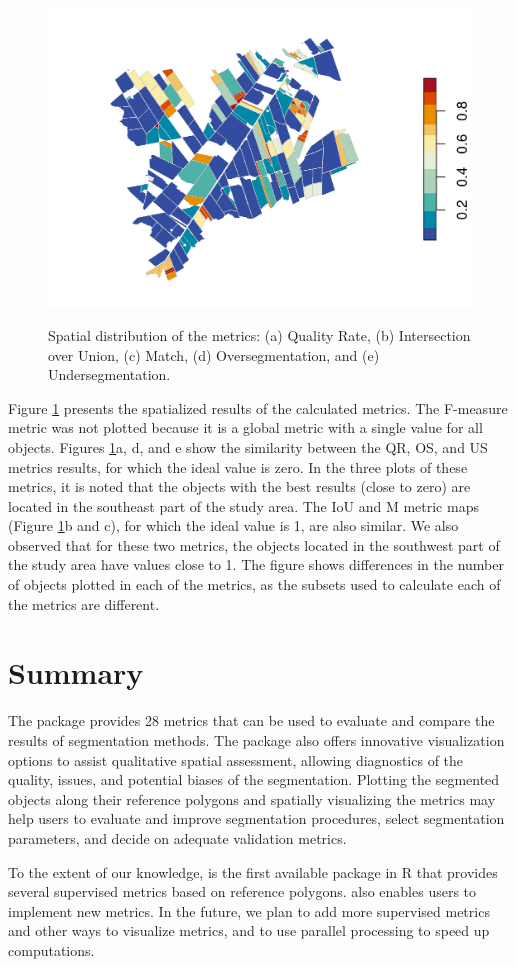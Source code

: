 \begin{figure}[!ht]
    {\includegraphics[trim=60 10 0 10, clip, width=.49\textwidth]{fig6e.png}}
    \caption{Spatial distribution of the metrics: (a) Quality Rate, (b) Intersection over Union, (c) Match, (d) Oversegmentation, and (e) Undersegmentation.}
    \label{fig:plot_metrics}
\end{figure}

Figure \ref{fig:plot_metrics} presents the spatialized results of the calculated metrics. 
The F-measure metric was not plotted because it is a global metric with a single value for all objects. 
Figures \ref{fig:plot_metrics}a, d, and e show the similarity between the QR, OS, and US metrics results, for which the ideal value is zero. 
In the three plots of these metrics, it is noted that the objects with the best results (close to zero) are located in the southeast part of the study area.
The IoU and M metric maps (Figure \ref{fig:plot_metrics}b and c), for which the ideal value is 1, are also similar. 
We also observed that for these two metrics, the objects located in the southwest part of the study area have values close to 1. 
The figure shows differences in the number of objects plotted in each of the metrics, as the subsets used to calculate each of the metrics are different.

\section{Summary}

The  package provides 28 metrics that can be used to evaluate and compare the results of segmentation methods.
The package also offers innovative visualization options to assist qualitative spatial assessment, allowing diagnostics of the quality, issues, and potential biases of the segmentation. 
Plotting the segmented objects along their reference polygons and spatially visualizing the metrics may help users to evaluate and improve segmentation procedures, select segmentation parameters, and decide on adequate validation metrics.

To the extent of our knowledge,  is the first available package in R that provides several supervised metrics based on reference polygons.  also enables users to implement new metrics. In the future, we plan to add more supervised metrics and other ways to visualize metrics, and to use parallel processing to speed up computations.


